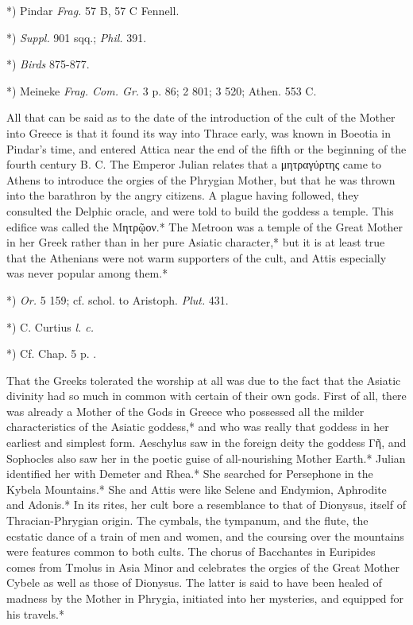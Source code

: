 \documentclass[a4paper, 11pt, oneside, polutonikogreek, english]{article}
\begin{document}
*) Pindar \emph{Frag.} 57 B, 57 C Fennell.

*) \emph{Suppl.} 901 sqq.; \emph{Phil.} 391.

*) \emph{Birds} 875-877.

*) Meineke \emph{Frag. Com. Gr.} 3 p. 86; 2 801; 3 520; Athen. 553 C.

All that can be said as to the date of the introduction of the cult of the Mother into Greece is that it found its way into Thrace early, was known in Boeotia in Pindar's time, and entered Attica near the end of the fifth or the beginning of the fourth century B. C. The Emperor Julian relates that a μητραγύρτης came to Athens to introduce the orgies of the Phrygian Mother, but that he was thrown into the barathron by the angry citizens. A plague having followed, they consulted the Delphic oracle, and were told to build the goddess a temple. This edifice was called the Μητρῷον.* The Metroon was a temple of the Great Mother in her Greek rather than in her pure Asiatic character,* but it is at least true that the Athenians were not warm supporters of the cult, and Attis especially was never popular among them.*

*) \emph{Or.} 5 159; cf. schol. to Aristoph. \emph{Plut.} 431.

*) C. Curtius \emph{l. c.}

*) Cf. Chap. 5 p. .

That the Greeks tolerated the worship at all was due to the fact that the Asiatic divinity had so much in common with certain of their own gods. First of all, there was already a Mother of the Gods in Greece who possessed all the milder characteristics of the Asiatic goddess,* and who was really that goddess in her earliest and simplest form. Aeschylus saw in the foreign deity the goddess Γῆ, and Sophocles also saw her in the poetic guise of all-nourishing Mother Earth.* Julian identified her with Demeter and Rhea.* She searched for Persephone in the Kybela Mountains.* She and Attis were like Selene and Endymion, Aphrodite and Adonis.* In its rites, her cult bore a resemblance to that of Dionysus, itself of Thracian-Phrygian origin. The cymbals, the tympanum, and the flute, the ecstatic dance of a train of men and women, and the coursing over the mountains were features common to both cults. The chorus of Bacchantes in Euripides comes from Tmolus in Asia Minor and celebrates the orgies of the Great Mother Cybele as well as those of Dionysus. The latter is said to have been healed of madness by the Mother in Phrygia, initiated into her mysteries, and equipped for his travels.*
\end{document}
